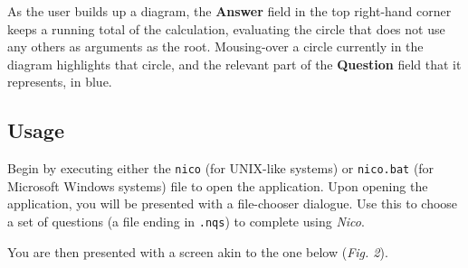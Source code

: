 \documentclass[14pt]{article}
\begin{document}
As the user builds up a diagram, the {\bf {\sffamily Answer}} field in the top
right-hand corner keeps a running total of the calculation, evaluating the circle
that does not use any others as arguments as the root.  Mousing-over a circle
currently in the diagram highlights that circle, and the relevant part of the
{\bf {\sffamily Question}} field that it represents, in blue.

\subsection*{Usage}

Begin by executing either the \verb¬nico¬ (for UNIX-like systems) or
\verb¬nico.bat¬ (for Microsoft Windows systems) file to open the application.
Upon opening the application, you will be presented with a file-chooser dialogue.
Use this to choose a set of questions (a file ending in \verb¬.nqs¬) to complete
using \emph{Nico}.

You are then presented with a screen akin to the one below (\emph{Fig. 2}).
\end{document}
